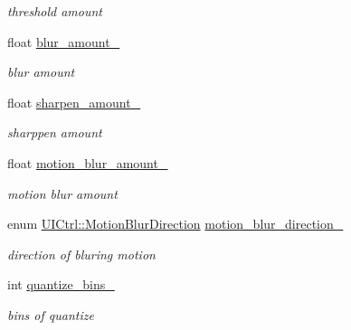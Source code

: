 \begin{DoxyCompactItemize}
\begin{DoxyCompactList}\small\item\em threshold amount \end{DoxyCompactList}\item 
float \hyperlink{classimage__tools_1_1FilterManager_ad4d6873f960dc8bfefa2c0b0646424cc}{blur\+\_\+amount\+\_\+}\hypertarget{classimage__tools_1_1FilterManager_ad4d6873f960dc8bfefa2c0b0646424cc}{}\label{classimage__tools_1_1FilterManager_ad4d6873f960dc8bfefa2c0b0646424cc}

\begin{DoxyCompactList}\small\item\em blur amount \end{DoxyCompactList}\item 
float \hyperlink{classimage__tools_1_1FilterManager_ac5d43a3c19e97050da7c7398fdad8d0c}{sharpen\+\_\+amount\+\_\+}\hypertarget{classimage__tools_1_1FilterManager_ac5d43a3c19e97050da7c7398fdad8d0c}{}\label{classimage__tools_1_1FilterManager_ac5d43a3c19e97050da7c7398fdad8d0c}

\begin{DoxyCompactList}\small\item\em sharppen amount \end{DoxyCompactList}\item 
float \hyperlink{classimage__tools_1_1FilterManager_aa4e2ba07745adae7c96611f6f26a6f62}{motion\+\_\+blur\+\_\+amount\+\_\+}\hypertarget{classimage__tools_1_1FilterManager_aa4e2ba07745adae7c96611f6f26a6f62}{}\label{classimage__tools_1_1FilterManager_aa4e2ba07745adae7c96611f6f26a6f62}

\begin{DoxyCompactList}\small\item\em motion blur amount \end{DoxyCompactList}\item 
enum \hyperlink{classimage__tools_1_1UICtrl_a56d4f68bf91302769d7bc453d8d57cee}{U\+I\+Ctrl\+::\+Motion\+Blur\+Direction} \hyperlink{classimage__tools_1_1FilterManager_a30ca33244f4ded5d2a010aff29d029d5}{motion\+\_\+blur\+\_\+direction\+\_\+}\hypertarget{classimage__tools_1_1FilterManager_a30ca33244f4ded5d2a010aff29d029d5}{}\label{classimage__tools_1_1FilterManager_a30ca33244f4ded5d2a010aff29d029d5}

\begin{DoxyCompactList}\small\item\em direction of bluring motion \end{DoxyCompactList}\item 
int \hyperlink{classimage__tools_1_1FilterManager_a22ded8b004ee7e8f40db72fd1ab95bf5}{quantize\+\_\+bins\+\_\+}\hypertarget{classimage__tools_1_1FilterManager_a22ded8b004ee7e8f40db72fd1ab95bf5}{}\label{classimage__tools_1_1FilterManager_a22ded8b004ee7e8f40db72fd1ab95bf5}

\begin{DoxyCompactList}\small\item\em bins of quantize \end{DoxyCompactList}\end{DoxyCompactItemize}


